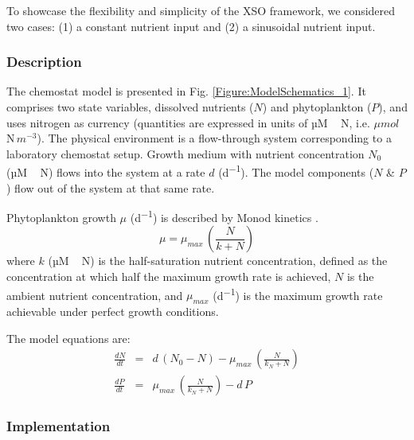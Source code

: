 \documentclass[journal abbreviation, manuscript]{copernicus}
\begin{document}
To showcase the flexibility and simplicity of the XSO framework, we considered two cases: (1) a constant nutrient input and (2) a sinusoidal nutrient input.

\subsubsection{Description}
The chemostat model is presented in Fig. \ref{Figure:ModelSchematics_1}. It comprises two state variables, dissolved nutrients ($N$) and phytoplankton ($P$), and uses nitrogen as currency (quantities are expressed in units of \unit{µM\,N}, i.e. $\mu mol$\,N\,$m^{-3}$). The physical environment is a flow-through system corresponding to a laboratory chemostat setup. Growth medium with nutrient concentration $N_0$ (\unit{µM\,N}) flows into the system at a rate $d$ (\unit{d^{-1}}). The model components ($N$ \& $P$) flow out of the system at that same rate.

Phytoplankton growth $\mu$ (\unit{d^{-1}}) is described by Monod kinetics \citep{Monod1942RecherchesBacteriennes}.
\begin{equation}
    \mu = \mu_{max}\,\left(\frac{N}{k + N}\right) 
\end{equation}
where $k$ (\unit{µM\,N}) is the half-saturation nutrient concentration, defined as the concentration at which half the maximum growth rate is achieved, $N$ is the ambient nutrient concentration, and $\mu_{max}$ (\unit{d^{-1}}) is the maximum growth rate achievable under perfect growth conditions.

The model equations are:
\begin{eqnarray}
\frac{d N}{d t} & = & d\,(N_0 - N) -\mu_{max}\,\left(\frac{N}{k_N + N}\right) \\
\frac{d P}{d t} & = & \mu_{max}\,\left(\frac{N}{k_N + N}\right) - d\,P
\end{eqnarray}



\subsubsection{Implementation}
\end{document}
